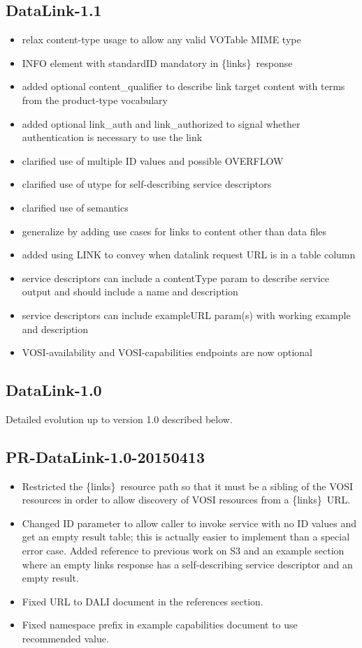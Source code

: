 \documentclass[11pt,a4paper]{ivoa}
\newcommand{\blinks}{\{links\}}
\begin{document}
\subsection{DataLink-1.1}

\begin{itemize}
\item relax content-type usage to allow any valid VOTable MIME type
\item INFO element with standardID mandatory in \blinks\ response
\item added optional content\_qualifier to describe link target content with terms from 
the product-type vocabulary
\item added optional link\_auth and link\_authorized to signal whether authentication
is necessary to use the link
\item clarified use of multiple ID values and possible OVERFLOW
\item clarified use of utype for self-describing service descriptors
\item clarified use of semantics
\item generalize by adding use cases for links to content other than data files 
\item added using LINK to convey when datalink request URL is in a table column
\item service descriptors can include a contentType param to describe service
output and should include a name and description
\item service descriptors can include exampleURL param(s) with working example
and description
\item VOSI-availability and VOSI-capabilities endpoints are now optional
\end{itemize}

\subsection{DataLink-1.0}

Detailed evolution up to version 1.0 described below.

\subsection{PR-DataLink-1.0-20150413}

\begin{itemize}
\item
Restricted the \blinks\ resource path so that it must be a sibling of
the VOSI resources in order to allow discovery of VOSI resources from
a \blinks\ URL.
\item
Changed ID parameter to allow caller to invoke service with no ID values
and get an empty result table; this is actually easier to implement
than a special error case. Added reference to previous work on S3 and
an example section where an empty links response has a self-describing
service descriptor and an empty result.
\item
Fixed URL to DALI document in the references section.
\item
Fixed namespace prefix in example capabilities document to use recommended
value.
\end{itemize}
\end{document}
